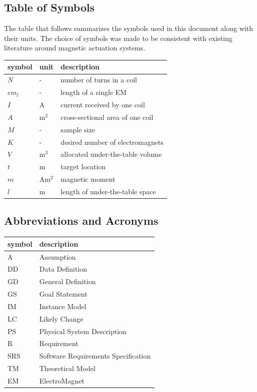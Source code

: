 \documentclass[12pt]{article}
\begin{document}
\subsection{Table of Symbols}

The table that follows summarizes the symbols used in this document along with
their units.  The choice of symbols was made to be consistent with existing literature around magnetic actuation systems.

\renewcommand{\arraystretch}{1.2}
\noindent \begin{longtable*}{l l p{12cm}} \toprule
\textbf{symbol} & \textbf{unit} & \textbf{description}\\
\midrule 
$N$ & - & number of turns in a coil
\\
$em_l$ & - & length of a single EM
\\
$I$ & \si{\ampere} & current received by one coil
\\
$A$ & \si{\metre}$^2$ & cross-sectional area of one coil
\\
$M$ & - & sample size
\\
$K$ & - & desired number of electromagnets 
\\
$V$ & \si{\metre}$^3$ & allocated under-the-table volume
\\
$t$ & \si{\metre} & target location
\\
$m$ & \si{\ampere}\si{\metre}$^2$ & magnetic moment
\\
$l$ & \si{\metre} & length of under-the-table space
\\
\bottomrule
\end{longtable*}


\subsection{Abbreviations and Acronyms}

\renewcommand{\arraystretch}{1.2}
\begin{tabular}{l l} 
  \toprule		
  \textbf{symbol} & \textbf{description}\\
  \midrule 
  A & Assumption\\
  DD & Data Definition\\
  GD & General Definition\\
  GS & Goal Statement\\
  IM & Instance Model\\
  LC & Likely Change\\
  PS & Physical System Description\\
  R & Requirement\\
  SRS & Software Requirements Specification\\
  TM & Theoretical Model\\
  EM & ElectroMagnet \\
  \bottomrule
\end{tabular}\\
\end{document}
